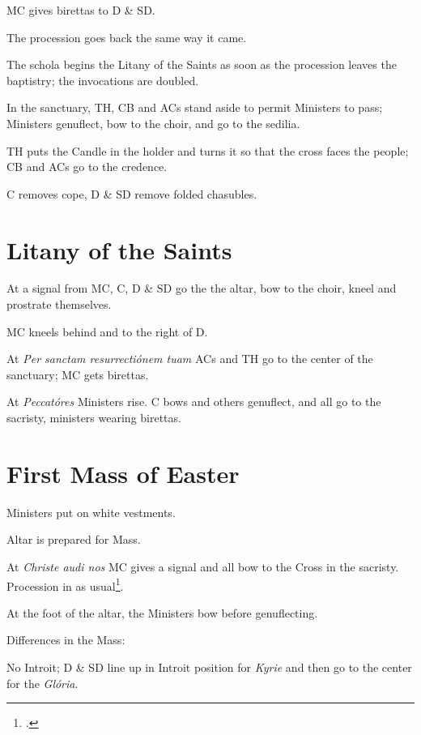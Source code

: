 {\rubric MC gives birettas to D \& SD.

\rubric The procession goes back the same way it came. 

\rubric The schola begins the Litany of the Saints as soon as the procession
leaves the baptistry; the invocations are doubled.

\rubric In the sanctuary, TH, CB and ACs stand aside to permit Ministers to
pass; Ministers genuflect, bow to the choir, and go to the sedilia.

\rubric TH puts the Candle in the holder and turns it so that the cross faces
the people; CB and ACs go to the credence.

\rubric C removes cope, D \& SD remove folded chasubles.

\section{Litany of the Saints}

\rubric At a signal from MC, C, D \& SD go the the altar, bow to the choir,
kneel and prostrate themselves.

\rubric MC kneels behind and to the right of D.

\rubric At \textit{Per sanctam resurrectiónem tuam} ACs and TH go to the center
of the sanctuary; MC gets birettas.

\rubric At \textit{Peccatóres} Ministers rise. C bows and others genuflect, and
all go to the sacristy, ministers wearing birettas.

\section{First Mass of Easter}

\rubric Ministers put on white vestments.

\rubric Altar is prepared for Mass.

\rubric At \textit{Christe audi nos} MC gives a signal and all bow to the Cross
in the sacristy. Procession in as usual\footcite[If the baptismal font was
blessed, the AC's candles are already on the credence table; if the font was
not blessed, the ACs carry them.][footnote, p. 233]{hweekls}.

\rubric At the foot of the altar, the Ministers bow before genuflecting.

\rubric Differences in the Mass:

\rubric No Introit; D \& SD line up in Introit position for \textit{Kyrie} and
then go to the center for the \textit{Glória}.

}
